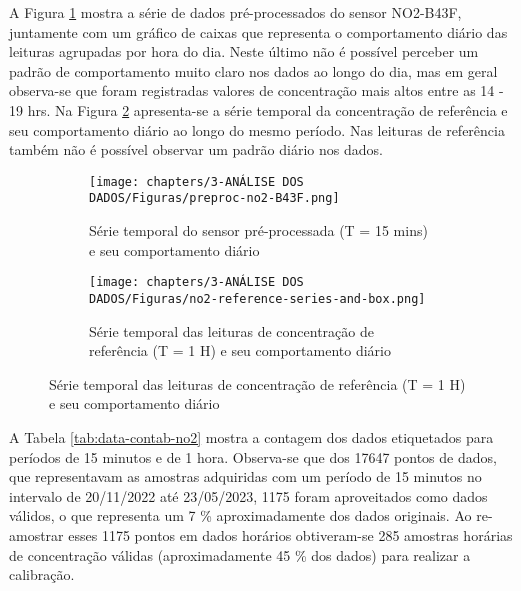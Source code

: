 A Figura \ref{fig:data-no2-preproc-box} mostra a série de dados pré-processados do sensor NO2-B43F, juntamente com um gráfico de caixas que representa o comportamento diário das leituras agrupadas por hora do dia. Neste último não é possível perceber um padrão de comportamento muito claro nos dados ao longo do dia, mas em geral observa-se que foram registradas valores de concentração mais altos entre as 14 - 19 hrs. Na Figura \ref{fig:data-no2-reference-box} apresenta-se a série temporal da concentração de referência e seu comportamento diário ao longo do mesmo período. Nas leituras de referência também não é possível observar um padrão diário nos dados.

\begin{figure}[h]
    \centering
    \begin{subfigure}{0.9\textwidth}
        \texttt{[image: chapters/3-ANÁLISE DOS DADOS/Figuras/preproc-no2-B43F.png]}
        \caption{Série temporal do sensor pré-processada (T = 15 mins) e seu comportamento diário}
        \label{fig:data-no2-preproc-box}
    \end{subfigure}
    \hfill
    \centering
    \begin{subfigure}{0.9\textwidth}
        \texttt{[image: chapters/3-ANÁLISE DOS DADOS/Figuras/no2-reference-series-and-box.png]}
        \caption{Série temporal das leituras de concentração de referência (T = 1 H) e seu comportamento diário}
        \label{fig:data-no2-reference-box}
    \end{subfigure}
    \hfill
    \label{fig:data-no2-box}
\end{figure}

A Tabela \ref{tab:data-contab-no2} mostra a contagem dos dados etiquetados para períodos de 15 minutos e de 1 hora. Observa-se que dos 17647 pontos de dados, que representavam as amostras adquiridas com um período de 15 minutos no intervalo de 20/11/2022 até 23/05/2023, 1175 foram aproveitados como dados válidos, o que representa um 7 \% aproximadamente dos dados originais. Ao re-amostrar esses 1175 pontos em dados horários obtiveram-se 285 amostras horárias de concentração válidas (aproximadamente 45 \% dos dados) para realizar a calibração.

